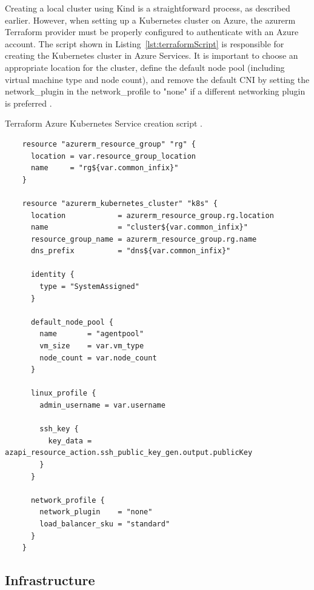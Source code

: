 Creating a local cluster using Kind is a straightforward process, as described earlier. However, when setting up a Kubernetes cluster on Azure, the azurerm Terraform provider must be properly configured to authenticate with an Azure account. The script shown in Listing~\ref{lst:terraformScript} is responsible for creating the Kubernetes cluster in Azure Services. It is important to choose an appropriate location for the cluster, define the default node pool (including virtual machine type and node count), and remove the default CNI by setting the network\_plugin in the network\_profile to "none" if a different networking plugin is preferred \cite{AKS}.

\begin{listing}[htb]
  \centering
  \caption{Terraform Azure Kubernetes Service creation script \cite{AKS}.}
  \begin{verbatim}
    resource "azurerm_resource_group" "rg" {
      location = var.resource_group_location
      name     = "rg${var.common_infix}"
    }

    resource "azurerm_kubernetes_cluster" "k8s" {
      location            = azurerm_resource_group.rg.location
      name                = "cluster${var.common_infix}"
      resource_group_name = azurerm_resource_group.rg.name
      dns_prefix          = "dns${var.common_infix}"

      identity {
        type = "SystemAssigned"
      }

      default_node_pool {
        name       = "agentpool"
        vm_size    = var.vm_type
        node_count = var.node_count
      }

      linux_profile {
        admin_username = var.username

        ssh_key {
          key_data = azapi_resource_action.ssh_public_key_gen.output.publicKey
        }
      }

      network_profile {
        network_plugin    = "none"
        load_balancer_sku = "standard"
      }
    }
  \end{verbatim}
  \label{lst:terraformScript}
\end{listing}


\subsection{Infrastructure}
\label{sec:infra}

